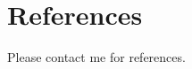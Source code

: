 \documentclass[12pt,letterpaper,sans]{moderncv} %
\begin{document}
\section{References}

Please contact me for references.

%
%
%
%
%
%
%
\end{document}
